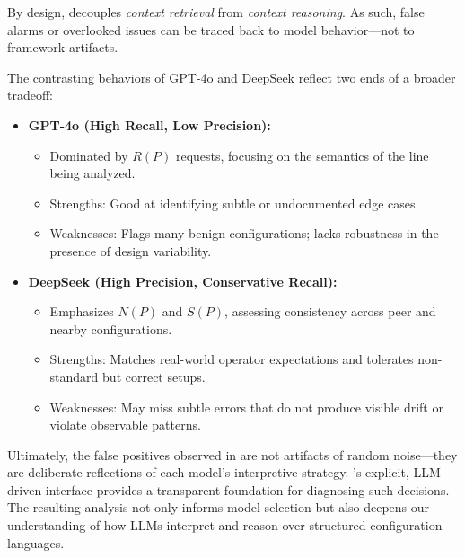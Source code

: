 By design, \sysname{} decouples \textit{context retrieval} from \textit{context reasoning}. As such, false alarms or overlooked issues can be traced back to model behavior—not to framework artifacts.

The contrasting behaviors of GPT-4o and DeepSeek reflect two ends of a broader tradeoff:

\begin{itemize}
    \item \textbf{GPT-4o (High Recall, Low Precision):}
    \begin{itemize}
        \item Dominated by $R(P)$ requests, focusing on the semantics of the line being analyzed.
        \item Strengths: Good at identifying subtle or undocumented edge cases.
        \item Weaknesses: Flags many benign configurations; lacks robustness in the presence of design variability.
    \end{itemize}

    \item \textbf{DeepSeek (High Precision, Conservative Recall):}
    \begin{itemize}
        \item Emphasizes $N(P)$ and $S(P)$, assessing consistency across peer and nearby configurations.
        \item Strengths: Matches real-world operator expectations and tolerates non-standard but correct setups.
        \item Weaknesses: May miss subtle errors that do not produce visible drift or violate observable patterns.
    \end{itemize}
\end{itemize}

Ultimately, the false positives observed in \sysname{} are not artifacts of random noise—they are deliberate reflections of each model’s interpretive strategy. \sysname{}’s explicit, LLM-driven interface provides a transparent foundation for diagnosing such decisions. The resulting analysis not only informs model selection but also deepens our understanding of how LLMs interpret and reason over structured configuration languages. 
